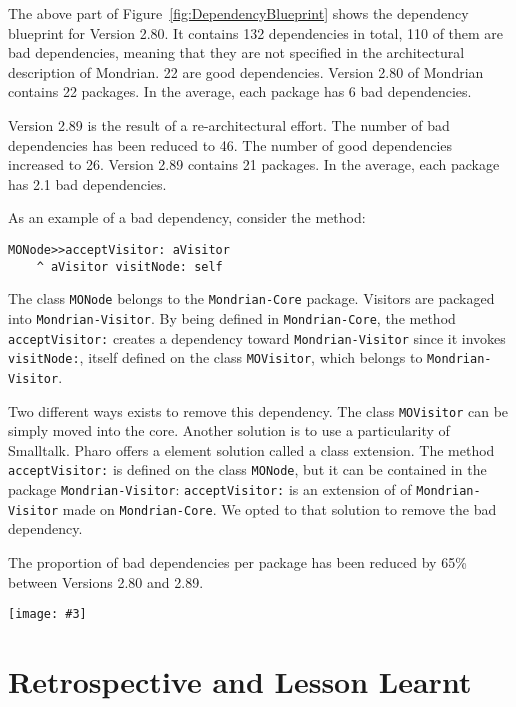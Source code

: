 \documentclass[runningheads]{llncs}
\newcommand{\ct}{\lstinline[backgroundcolor=\color{white},basicstyle=\footnotesize\ttfamily]}
\newcommand{\largefig}[4]{
	\begin{figure*}[#1]
		\centering
		\texttt{[image: \#3]}
		\caption{\label{fig:#3}#4}
	\end{figure*}}
\newcommand{\seclabel}[1]{\label{sec:#1}}
\newcommand{\figref}[1]{Figure~\ref{fig:#1}}
\begin{document}

The above part of \figref{DependencyBlueprint} shows the dependency blueprint for Version 2.80. It contains 132 dependencies in total, 110 of them are bad dependencies, meaning that they are not specified in the architectural description of Mondrian.  22 are good dependencies. Version 2.80 of Mondrian contains 22 packages. In the average, each package has 6 bad dependencies. 

Version 2.89 is the result of a re-architectural effort. The number of bad dependencies has been reduced to 46. The number of good dependencies increased to 26. Version 2.89 contains 21 packages.  In the average, each package has 2.1 bad dependencies.

As an example of a bad dependency, consider the method:

\begin{lstlisting}
MONode>>acceptVisitor: aVisitor
	^ aVisitor visitNode: self
\end{lstlisting}

The class \ct{MONode} belongs to the \ct{Mondrian-Core} package. Visitors are packaged into \ct{Mondrian-Visitor}. By being defined in \ct{Mondrian-Core}, the method \ct{acceptVisitor:} creates a dependency toward \ct{Mondrian-Visitor} since it invokes \ct{visitNode:}, itself defined on the class \ct{MOVisitor}, which belongs to \ct{Mondrian-Visitor}. 

Two different ways exists to remove this dependency. The class \ct{MOVisitor} can be simply moved into the core. Another solution is to use a particularity of Smalltalk. Pharo offers a element solution called a class extension. The method \ct{acceptVisitor:} is defined on the class \ct{MONode}, but it can be contained in the package \ct{Mondrian-Visitor}: \ct{acceptVisitor:} is an extension of of \ct{Mondrian-Visitor} made on \ct{Mondrian-Core}. We opted to that solution to remove the bad dependency.

The proportion of bad dependencies per package has been reduced by 65\% between Versions 2.80 and 2.89.

\largefig{}{1.23}{DependencyBlueprint}{Evolution of Mondrian dependencies.}

\section{Retrospective and Lesson Learnt} \seclabel{lessonLearnt}
\end{document}
